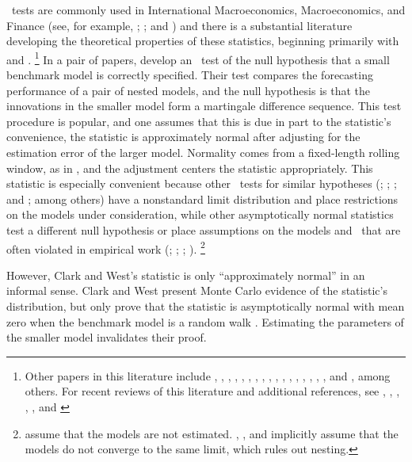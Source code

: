 \documentclass[12pt,fleqn]{article}
\begin{document}
\oos\ tests are commonly used in International Macroeconomics,
Macroeconomics, and Finance (see, for example, \citealt{MeR:83};
\citealt{StW:03}; and \citealt{GoW:08}) and there is a substantial
literature developing the theoretical properties of these statistics,
beginning primarily with \citet{DiM:95} and
\citet{Wes:96}.%
\footnote{Other papers in this literature include
  \citet{WeM:98}, \citet{Mcc:98,Mcc:00},
  \citet{ClM:01,ClM:05-2,ClM:05,ClM:11b,ClM:12,ClM:12b},
  \citet{CCS:01}, \citet{CoS:02,CoS:04,CoS:07}, \citet{Whi:00},
  \citet{InK:04,InK:06}, \citet{Han:05}, \citet{Ros:05},
  \citet{ClW:06,ClW:07}, \citet{Ana:07}, \citet{GiR:09,GiR:10},
  \citet{HuW:10}, \citet{HLN:11}, \cite{InR:11}, \cite{Pin:11},
  \cite{RoS:11,RoS:11b}, and \citet{Cal:11}, among others.  For recent
  reviews of this literature and additional references, see
  \citet{McW:02}, \citet{CoS:06}, \citet{Wes:06}, \citet{ClM:11c},
  \citet{CoD:11}, and \citet{Gia:11}} %
In a pair of papers,
\citet{ClW:06,ClW:07} develop an \oos\ test of the null hypothesis
that a small benchmark model is correctly specified.  Their test
compares the forecasting performance of a pair of nested models, and
the null hypothesis is that the innovations in the smaller model form
a martingale difference sequence.  This test procedure is popular, and
one assumes that this is due in part to the statistic's convenience,
the statistic is approximately normal after adjusting for the
estimation error of the larger model.  Normality comes from a
fixed-length rolling window, as in \citet{GiW:06}, and the adjustment
centers the statistic appropriately.  This statistic is especially
convenient because other \oos\ tests for similar hypotheses
(\citealt{CCS:01}; \citealt{ClM:01,ClM:05}; \citealt{CoS:02,CoS:04};
and \citealt{Mcc:07}; among others) have a nonstandard limit
distribution and place restrictions on the models under consideration,
while other asymptotically normal statistics test a different null
hypothesis \citep{GiW:06} or place assumptions on the models and \dgp\
that are often violated in empirical work (\citealt{DiM:95};
\citealt{Wes:96}; \citealt{WeM:98};
\citealt{Mcc:00}).%
\footnote{\citet{DiM:95} assume that the models are
  not estimated. \citet{Wes:96}, \citet{WeM:98}, and \citet{Mcc:00}
  implicitly assume that the models do not converge to the same limit,
  which rules out nesting.} %

However, Clark and West's statistic is only ``approximately normal''
in an informal sense.  Clark and West present Monte Carlo evidence of
the statistic's distribution, but only prove that the statistic is
asymptotically normal with mean zero when the benchmark model is a
random walk \citep{ClW:06}. Estimating the parameters of the smaller
model invalidates their proof.
\end{document}

